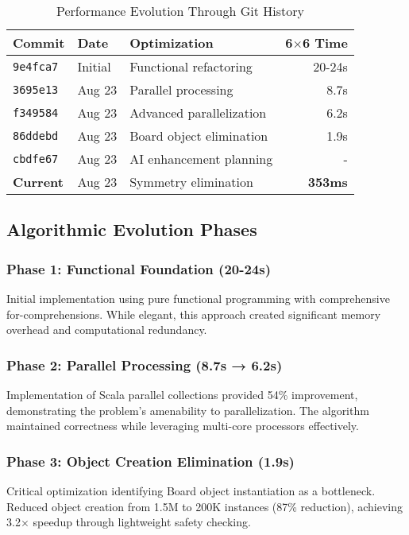 \documentclass[12pt,a4paper]{article}
\theoremstyle{definition}
\begin{document}
\begin{table}[h]
\centering
\caption{Performance Evolution Through Git History}
\begin{tabular}{@{}lllr@{}}
\toprule
Commit & Date & Optimization & 6$\times$6 Time \\
\midrule
\texttt{9e4fca7} & Initial & Functional refactoring & 20-24s \\
\texttt{3695e13} & Aug 23 & Parallel processing & 8.7s \\
\texttt{f349584} & Aug 23 & Advanced parallelization & 6.2s \\
\texttt{86ddebd} & Aug 23 & Board object elimination & 1.9s \\
\texttt{cbdfe67} & Aug 23 & AI enhancement planning & - \\
\textbf{Current} & Aug 23 & Symmetry elimination & \textbf{353ms} \\
\bottomrule
\end{tabular}
\end{table}

\subsection{Algorithmic Evolution Phases}

\subsubsection{Phase 1: Functional Foundation (20-24s)}
Initial implementation using pure functional programming with comprehensive for-comprehensions. While elegant, this approach created significant memory overhead and computational redundancy.

\subsubsection{Phase 2: Parallel Processing (8.7s → 6.2s)}
Implementation of Scala parallel collections provided 54\% improvement, demonstrating the problem's amenability to parallelization. The algorithm maintained correctness while leveraging multi-core processors effectively.

\subsubsection{Phase 3: Object Creation Elimination (1.9s)}
Critical optimization identifying Board object instantiation as a bottleneck. Reduced object creation from 1.5M to 200K instances (87\% reduction), achieving 3.2$\times$ speedup through lightweight safety checking.
\end{document}
